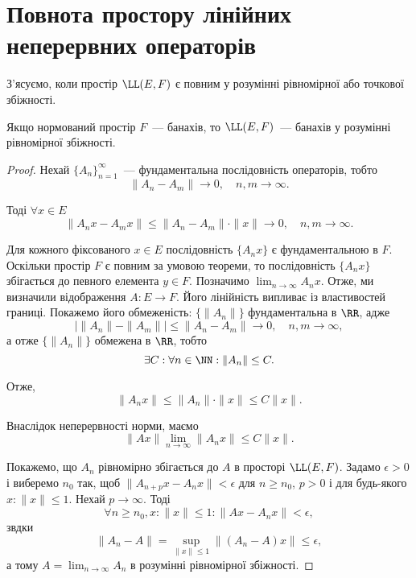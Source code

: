 \section{Повнота простору лінійних неперервних операторів}

З’ясуємо, коли простір $\LL(E, F)$ є повним у розумінні
рівномірної або точкової збіжності.

\begin{theorem}
Якщо нормований простір $F$~--- банахів,
то $\LL(E, F)$~--- банахів у розумінні рівномірної збіжності.
\end{theorem}

\begin{proof}
Нехай $\{A_n\}_{n = 1}^\infty$~--- фундаментальна
послідовність операторів, тобто
\begin{equation*}
    \|A_n - A_m\| \to 0, \quad n, m \to \infty.
\end{equation*}

Тоді $\forall x \in E$
\begin{equation*}
    \|A_n x - A_m x\| \le \|A_n - A_m\| \cdot \|x\| \to 0, \quad n, m \to \infty.
\end{equation*}

Для кожного фіксованого $x \in E$ послідовність $\{A_n x\}$ є
фундаментальною в $F$. Оскільки простір $F$ є повним за
умовою теореми, то послідовність $\{A_n x\}$ збігається до
певного елемента $y \in F$. Позначимо $\lim_{n \to \infty} A_n x$.
Отже, ми визначили відображення $A: E \to F$.
Його лінійність випливає із властивостей границі.
Покажемо його обмеженість:
$\{\|A_n\|\}$ фундаментальна в $\RR$, адже
\begin{equation*}
    |\|A_n\| - \|A_m\|| \le \|A_n - A_m\| \to 0, \quad n, m \to \infty,
\end{equation*}
а отже $\{\|A_n\|\}$ обмежена в $\RR$, тобто
\begin{equation*}
    \exists C: \forall n \in \NN: \|A_n\| \le C.
\end{equation*}

Отже,
\begin{equation*}
    \|A_n x\| \le \|A_n\| \cdot \|x\| \le C \|x\|.
\end{equation*}

Внаслідок неперервності норми, маємо
\begin{equation*}
    \|A x\| \lim_{n \to \infty} \|A_n x\| \le C \|x\|.
\end{equation*}

Покажемо, що $A_n$ рівномірно збігається до $A$ в просторі
$\LL(E, F)$. Задамо $\epsilon > 0$ і виберемо $n_0$ так, щоб
$\|A_{n + p} x - A_n x\| < \epsilon$ для $n \ge n_0$, $p > 0$ і для будь-якого
$x: \|x\| \le 1$.
Нехай $p \to \infty$. Тоді
\begin{equation*}
    \forall n \ge n_0, x: \|x\| \le 1:
    \|A x - A_n x\| < \epsilon,
\end{equation*}
звдки
\begin{equation*}
    \|A_n - A\| = \sup_{\|x\| \le 1} \|(A_n - A) x\| \le \epsilon,
\end{equation*}
а тому $A = \lim_{n \to \infty} A_n$
в розумінні рівномірної збіжності.


\end{proof}

